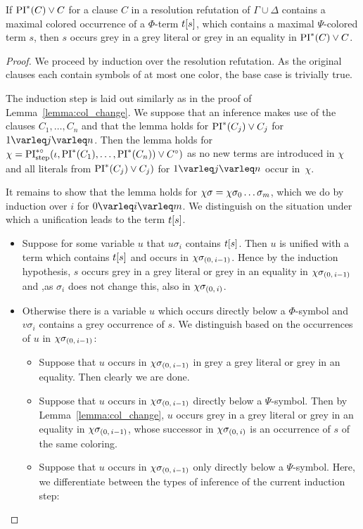 \documentclass[,%
	draft=false,%
	numbers=noendperiod
	12pt,
	a4paper,
	oneside,%
	openany,
]{memoir}
\newcommand{\inv}{\ensuremath{\chi}}
\begin{document}
\begin{lemma}
	\label{lemma:subterm_in_grey_lit_star}
	If $\operatorname{PI}^*(C) \lor C$ for a clause $C$ in a resolution refutation of $\Gamma \cup \Delta$ contains a maximal colored occurrence of a $\Phi$-term $t[s]$, which contains a maximal $\Psi$-colored term $s$, then $s$ occurs grey in a grey literal or grey in an equality in $\operatorname{PI}^*(C) \lor C$.
\end{lemma}
\begin{proof}
	We proceed by induction over the resolution refutation.
	As the original clauses each contain symbols of at most one color, the base case is trivially true.

	The induction step is laid out similarly as in the proof of Lemma~\ref{lemma:col_change}. 
	We suppose that an inference makes use of the clauses $C_1, \dots, C_n$ and that the lemma holds for $\operatorname{PI}^*(C_j) \lor C_j$ for $1\varleq j \varleq n$. 
	Then the lemma holds for $\inv = \PIstepstarnosigma(\inference, \PI^*(C_1), \dots, \PI^*(C_n)) \lor C\nosigma)$ as no new terms are introduced in $\inv$ and all literals from $\operatorname{PI}^*(C_j) \lor C_j)$ for $1\varleq j \varleq n$ occur in~$\inv$.

	It remains to show that the lemma holds for $\inv\sigma = \inv \sigma_0 \quantifierdots \sigma_m$, which we do by induction over $i$ for $0 \varleq i \varleq m$.
	We distinguish on the situation under which a unification leads to the term $t[s]$.

	\begin{itemize}
		\item 
			Suppose for some variable $u$ that $u\sigma_i$ contains $t[s]$. 
			Then $u$ is unified with a term which contains $t[s]$ and occurs in $\inv\sigmazmi$.
			Hence by the induction hypothesis, $s$ occurs grey in a grey literal or grey in an equality in $\inv\sigmazmi$ and ,as $\sigma_i$ does not change this, also in $\inv\sigmazi$.

		\item 
			Otherwise there is a variable $u$ which occurs directly below a $\Phi$-symbol and $v\sigma_i$ contains a grey occurrence of $s$.
			We distinguish based on the occurrences of $u$ in $\inv\sigmazmi$:

			\begin{itemize}
				\item Suppose that $u$ occurs in $\inv\sigmazmi$ in grey a grey literal or grey in an equality. Then clearly we are done.
				\item Suppose that $u$ occurs in $\inv\sigmazmi$ directly below a $\Psi$-symbol.
					Then by Lemma~\ref{lemma:col_change}, $u$ occurs grey in a grey literal or grey in an equality in $\inv\sigmazmi$, whose successor in $\inv\sigmazi$ is an occurrence of $s$ of the same coloring.
				\item Suppose that $u$ occurs in $\inv\sigmazmi$ only directly below a $\Psi$-symbol.
					Here, we differentiate between the types of inference of the current induction step:


\end{itemize}
\end{itemize}
\end{proof}
\end{document}
